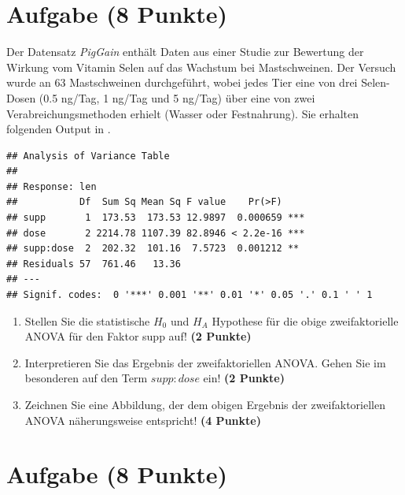 \documentclass[a4paper, 10pt]{scrartcl}\usepackage[]{graphicx}\usepackage[]{xcolor}
\makeatletter
\newenvironment{kframe}{%
 \def\at@end@of@kframe{}%
 \ifinner\ifhmode%
  \def\at@end@of@kframe{\end{minipage}}%
  \begin{minipage}{\columnwidth}%
 \fi\fi%
 \def\FrameCommand##1{\hskip\@totalleftmargin \hskip-\fboxsep
 \colorbox{shadecolor}{##1}\hskip-\fboxsep
     \hskip-\linewidth \hskip-\@totalleftmargin \hskip\columnwidth}%
 \MakeFramed {\advance\hsize-\width
   \@totalleftmargin\z@ \linewidth\hsize
   \@setminipage}}%
 {\par\unskip\endMakeFramed%
 \at@end@of@kframe}
\newenvironment{knitrout}{}{} %
\makeatother
\begin{document}
\clearpage

\section{Aufgabe \hfill (8 Punkte)}



Der Datensatz \textit{PigGain} enth{\"a}lt Daten aus einer Studie zur Bewertung
der Wirkung vom Vitamin Selen auf das Wachstum bei Mastschweinen. Der
Versuch wurde an 63 Mastschweinen durchgef{\"u}hrt, wobei
jedes Tier eine von drei Selen-Dosen (0.5 ng/Tag, 1 ng/Tag und 5 ng/Tag)
{\"u}ber eine von zwei Verabreichungsmethoden erhielt (Wasser oder
Festnahrung). Sie erhalten folgenden Output in \Rlogo.

\begin{knitrout}
\color{fgcolor}\begin{kframe}
\begin{verbatim}
## Analysis of Variance Table
## 
## Response: len
##           Df  Sum Sq Mean Sq F value    Pr(>F)    
## supp       1  173.53  173.53 12.9897  0.000659 ***
## dose       2 2214.78 1107.39 82.8946 < 2.2e-16 ***
## supp:dose  2  202.32  101.16  7.5723  0.001212 ** 
## Residuals 57  761.46   13.36                      
## ---
## Signif. codes:  0 '***' 0.001 '**' 0.01 '*' 0.05 '.' 0.1 ' ' 1
\end{verbatim}
\end{kframe}
\end{knitrout}

\begin{enumerate}
\item Stellen Sie die statistische $H_0$ und $H_A$ Hypothese f{\"u}r die obige
  zweifaktorielle ANOVA f{\"u}r den Faktor supp
  auf! \textbf{(2 Punkte)}
\item Interpretieren Sie das Ergebnis der zweifaktoriellen ANOVA. Gehen Sie
  im besonderen auf den Term $supp:dose$ ein! \textbf{(2 Punkte)}
\item Zeichnen Sie eine Abbildung, der dem obigen Ergebnis der
  zweifaktoriellen ANOVA n{\"a}herungsweise entspricht! \textbf{(4 Punkte)}
\end{enumerate}
 
\clearpage

\section{Aufgabe \hfill (8 Punkte)}
\end{document}
